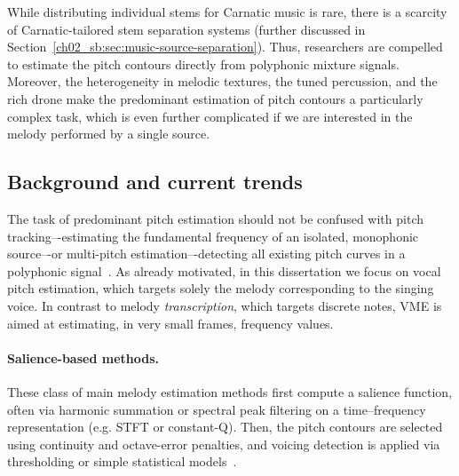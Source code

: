 
%
While distributing individual stems for Carnatic music is rare, there is a scarcity of Carnatic-tailored stem separation systems (further discussed in Section~\ref{ch02_sb:sec:music-source-separation}). Thus, researchers are compelled to estimate the pitch contours directly from polyphonic mixture signals. Moreover, the heterogeneity in melodic textures, the tuned percussion, and the rich drone make the predominant estimation of pitch contours a particularly complex task, which is even further complicated if we are interested in the melody performed by a single source.
%


\subsection{Background and current trends}
The task of predominant pitch estimation should not be confused with pitch tracking–-estimating the fundamental frequency of an isolated, monophonic source–-or multi-pitch estimation–-detecting all existing pitch curves in a polyphonic signal~\citep{bittner-thesis}. As already motivated, in this dissertation we focus on vocal pitch estimation, which
targets solely the melody corresponding to the singing voice. In contrast to melody \textit{transcription}, which targets discrete notes, \acrshort{VME} is aimed at estimating, in very small frames, frequency values.


\paragraph{Salience-based methods.} These class of main melody estimation methods first compute a salience function, often via harmonic summation or spectral peak filtering on a time–frequency representation (e.g. \acrfull{STFT} or constant-Q). Then, the pitch contours are selected using continuity and octave-error penalties, and voicing detection is applied via thresholding or simple statistical models~\citep{goto-f0,poliner-transcription,rao-pitch,salamon-melodia}.


